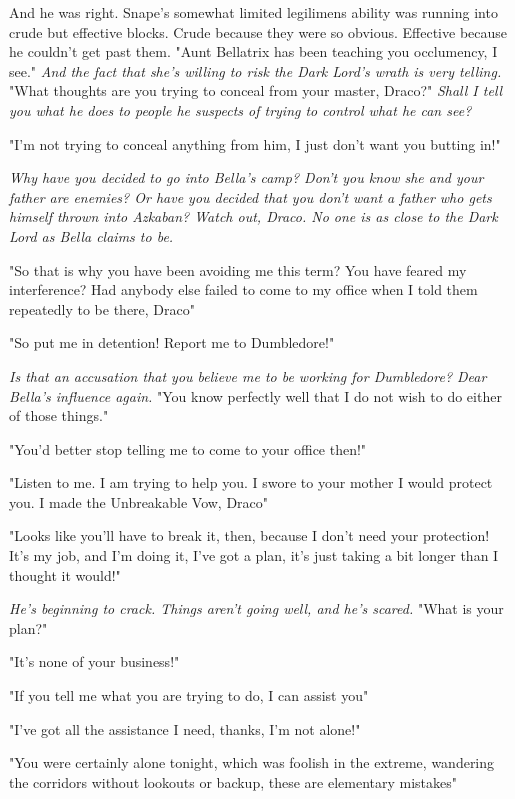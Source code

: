 And he was right. Snape's somewhat limited legilimens ability was running into crude but effective blocks. Crude because they were so obvious. Effective because he couldn't get past them. "Aunt Bellatrix has been teaching you occlumency, I see." \emph{And the fact that she's willing to risk the Dark Lord's wrath is very telling.} "What thoughts are you trying to conceal from your master, Draco?" \emph{Shall I tell you what he does to people he suspects of trying to control what he can see?}

"I'm not trying to conceal anything from him, I just don't want you butting in!"

\emph{Why have you decided to go into Bella's camp? Don't you know she and your father are enemies? Or have you decided that you don't want a father who gets himself thrown into Azkaban? Watch out, Draco. No one is as close to the Dark Lord as Bella claims to be.}

"So that is why you have been avoiding me this term? You have feared my interference? Had anybody else failed to come to my office when I told them repeatedly to be there, Draco{\el}"

"So put me in detention! Report me to Dumbledore!"

\emph{Is that an accusation that you believe me to be working for Dumbledore? Dear Bella's influence again.} "You know perfectly well that I do not wish to do either of those things."

"You'd better stop telling me to come to your office then!"

"Listen to me. I am trying to help you. I swore to your mother I would protect you. I made the Unbreakable Vow, Draco{\el}"

"Looks like you'll have to break it, then, because I don't need your protection! It's my job, and I'm doing it, I've got a plan, it's just taking a bit longer than I thought it would!"

\emph{He's beginning to crack. Things aren't going well, and he's scared.} "What is your plan?"

"It's none of your business!"

"If you tell me what you are trying to do, I can assist you{\el}"

"I've got all the assistance I need, thanks, I'm not alone!"

"You were certainly alone tonight, which was foolish in the extreme, wandering the corridors without lookouts or backup, these are elementary mistakes{\el}"

